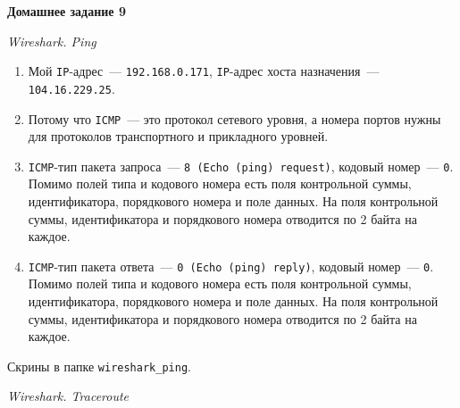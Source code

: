 \documentclass[12pt]{article}
\def\THEME{Домашнее задание 9}
\begin{document}
\begin{center}
\vspace*{0mm}
{\LARGE \bf \THEME}
\end{center}

\begin{center}
{\Large \it Wireshark. Ping}
\end{center}

\begin{enumerate}

\item Мой \texttt{IP}-адрес~--- \texttt{192.168.0.171}, \texttt{IP}-адрес хоста назначения~--- \texttt{104.16.229.25}.

\item Потому что \texttt{ICMP}~--- это протокол сетевого уровня, а номера портов нужны для протоколов транспортного и прикладного уровней.

\item \texttt{ICMP}-тип пакета запроса~--- \texttt{8 (Echo (ping) request)}, кодовый номер~--- \texttt{0}. Помимо полей типа и кодового номера есть поля контрольной суммы, идентификатора, порядкового номера и поле данных. На поля контрольной суммы, идентификатора и порядкового номера отводится по 2 байта на каждое.

\item \texttt{ICMP}-тип пакета ответа~--- \texttt{0 (Echo (ping) reply)}, кодовый номер~--- \texttt{0}. Помимо полей типа и кодового номера есть поля контрольной суммы, идентификатора, порядкового номера и поле данных. На поля контрольной суммы, идентификатора и порядкового номера отводится по 2 байта на каждое.

\end{enumerate}

Скрины в папке \texttt{wireshark\_ping}.

\begin{center}
{\Large \it Wireshark. Traceroute}
\end{center}
\end{document}

